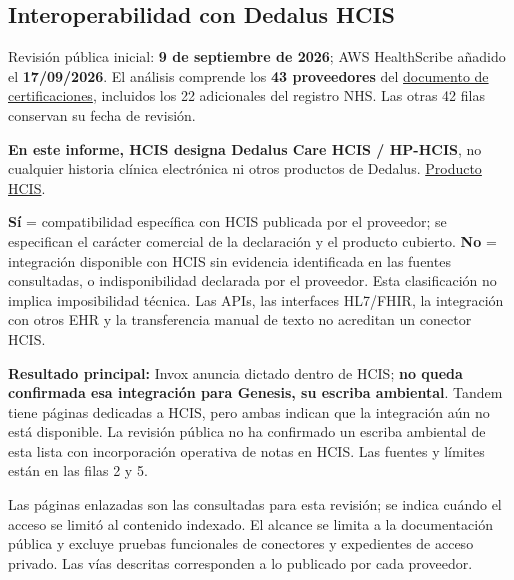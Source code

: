 \clearpage
\begin{landscape}
\section{Interoperabilidad con Dedalus HCIS}
\label{app:hcis}
\begingroup\footnotesize

Revisión pública inicial: \textbf{9 de septiembre de 2026}; AWS HealthScribe añadido el \textbf{17/\allowbreak{}09/\allowbreak{}2026}. El análisis comprende los \textbf{43 proveedores} del \hyperref[app:proveedores]{documento de certificaciones}, incluidos los 22 adicionales del registro NHS. Las otras 42 filas conservan su fecha de revisión.

\textbf{En este informe, HCIS designa Dedalus Care HCIS /\allowbreak{} HP-HCIS}, no cualquier historia clínica electrónica ni otros productos de Dedalus. \href{https://www.dedalus.com/spain/es/our-offer/products/hcis-can-be-implemented-using-a-best-of-breed-approach/}{Producto HCIS}.

\textbf{Sí} = compatibilidad específica con HCIS publicada por el proveedor; se especifican el carácter comercial de la declaración y el producto cubierto. \textbf{No} = integración disponible con HCIS sin evidencia identificada en las fuentes consultadas, o indisponibilidad declarada por el proveedor. Esta clasificación no implica imposibilidad técnica. Las APIs, las interfaces HL7/\allowbreak{}FHIR, la integración con otros EHR y la transferencia manual de texto no acreditan un conector HCIS.

\textbf{Resultado principal:} Invox anuncia dictado dentro de HCIS; \textbf{no queda confirmada esa integración para Genesis, su escriba ambiental}. Tandem tiene páginas dedicadas a HCIS, pero ambas indican que la integración aún no está disponible. La revisión pública no ha confirmado un escriba ambiental de esta lista con incorporación operativa de notas en HCIS. Las fuentes y límites están en las filas 2 y 5.

Las páginas enlazadas son las consultadas para esta revisión; se indica cuándo el acceso se limitó al contenido indexado. El alcance se limita a la documentación pública y excluye pruebas funcionales de conectores y expedientes de acceso privado. Las vías descritas corresponden a lo publicado por cada proveedor.


\end{landscape}
